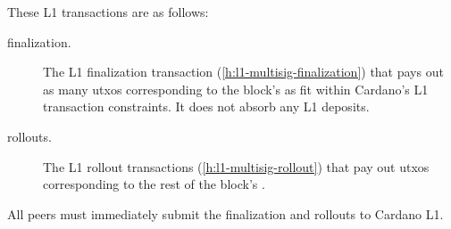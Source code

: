 \documentclass[../hydrozoa.tex]{subfiles}
\begin{document}
These L1 transactions are as follows:
\begin{description}
  \item[finalization.] The L1 finalization transaction (\cref{h:l1-multisig-finalization}) that pays out as many utxos corresponding to the block's  as fit within Cardano's L1 transaction constraints.
    It does not absorb any L1 deposits.
  \item[rollouts.] The L1 rollout transactions (\cref{h:l1-multisig-rollout}) that pay out utxos corresponding to the rest of the block's .
\end{description}

All peers must immediately submit the finalization and rollouts to Cardano L1.
\end{document}
